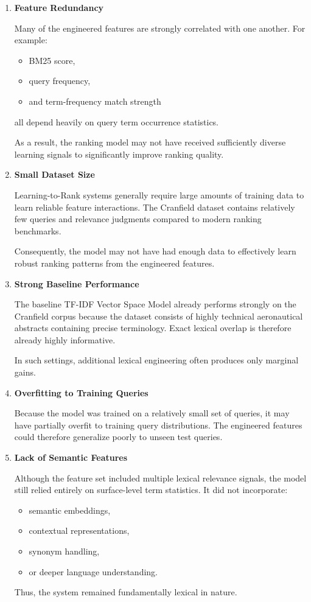 \documentclass{article}
\begin{document}
\begin{enumerate}
    \item \textbf{Feature Redundancy}

    Many of the engineered features are strongly correlated with one another. For example:
    \begin{itemize}
        \item BM25 score,
        \item query frequency,
        \item and term-frequency match strength
    \end{itemize}

    all depend heavily on query term occurrence statistics.

    As a result, the ranking model may not have received sufficiently diverse learning signals to significantly improve ranking quality.

    \item \textbf{Small Dataset Size}

    Learning-to-Rank systems generally require large amounts of training data to learn reliable feature interactions. The Cranfield dataset contains relatively few queries and relevance judgments compared to modern ranking benchmarks.

    Consequently, the model may not have had enough data to effectively learn robust ranking patterns from the engineered features.

    \item \textbf{Strong Baseline Performance}

    The baseline TF-IDF Vector Space Model already performs strongly on the Cranfield corpus because the dataset consists of highly technical aeronautical abstracts containing precise terminology. Exact lexical overlap is therefore already highly informative.

    In such settings, additional lexical engineering often produces only marginal gains.

    \item \textbf{Overfitting to Training Queries}

    Because the model was trained on a relatively small set of queries, it may have partially overfit to training query distributions. The engineered features could therefore generalize poorly to unseen test queries.

    \item \textbf{Lack of Semantic Features}

    Although the feature set included multiple lexical relevance signals, the model still relied entirely on surface-level term statistics. It did not incorporate:
    \begin{itemize}
        \item semantic embeddings,
        \item contextual representations,
        \item synonym handling,
        \item or deeper language understanding.
    \end{itemize}

    Thus, the system remained fundamentally lexical in nature.
\end{enumerate}
\end{document}
